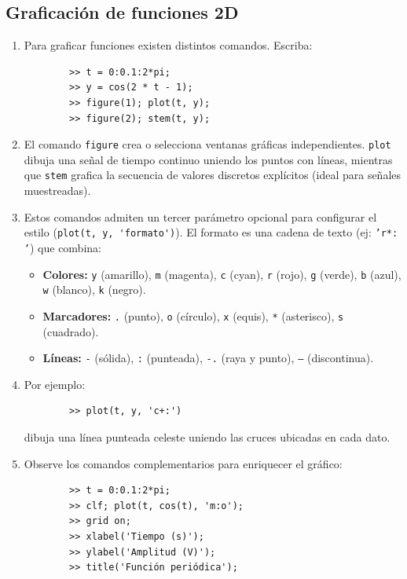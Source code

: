 \subsection{Graficación de funciones 2D}

\begin{enumerate}
	\item Para graficar funciones existen distintos comandos. Escriba:
	\begin{verbatim}
		>> t = 0:0.1:2*pi;
		>> y = cos(2 * t - 1);
		>> figure(1); plot(t, y);
		>> figure(2); stem(t, y);
	\end{verbatim}
	
	\item El comando \texttt{figure} crea o selecciona ventanas gráficas independientes. \texttt{plot} dibuja una señal de tiempo continuo uniendo los puntos con líneas, mientras que \texttt{stem} grafica la secuencia de valores discretos explícitos (ideal para señales muestreadas).
	
	\item Estos comandos admiten un tercer parámetro opcional para configurar el estilo (\verb-plot(t, y, 'formato')-). El formato es una cadena de texto (ej: \texttt{'r*: '}) que combina:
	\begin{itemize}
		\item \textbf{Colores:} \texttt{y} (amarillo), \texttt{m} (magenta), \texttt{c} (cyan), \texttt{r} (rojo), \texttt{g} (verde), \texttt{b} (azul), \texttt{w} (blanco), \texttt{k} (negro).
		\item \textbf{Marcadores:} \texttt{.} (punto), \texttt{o} (círculo), \texttt{x} (equis), \texttt{*} (asterisco), \texttt{s} (cuadrado).
		\item \textbf{Líneas:} \texttt{-} (sólida), \texttt{:} (punteada), \texttt{-.} (raya y punto), \texttt{--} (discontinua).
	\end{itemize}
	
	\item Por ejemplo:
	\begin{verbatim}
		>> plot(t, y, 'c+:')
	\end{verbatim}
	dibuja una línea punteada celeste uniendo las cruces ubicadas en cada dato.
	
	\item Observe los comandos complementarios para enriquecer el gráfico:
	\begin{verbatim}
		>> t = 0:0.1:2*pi;
		>> clf; plot(t, cos(t), 'm:o');
		>> grid on;
		>> xlabel('Tiempo (s)');
		>> ylabel('Amplitud (V)');
		>> title('Función periódica');
	\end{verbatim}
	

\end{enumerate}
